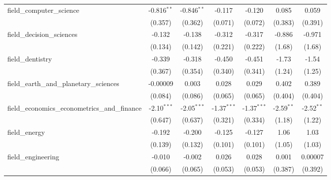 \begin{tabular}{lcccccc}
   field\_computer\_science                                    & -0.816$^{**}$ & -0.846$^{**}$  & -0.117        & -0.120         & 0.085         & 0.059\\   
                                                               & (0.357)       & (0.362)        & (0.071)       & (0.072)        & (0.383)       & (0.391)\\   
   field\_decision\_sciences                                   & -0.132        & -0.138         & -0.312        & -0.317         & -0.886        & -0.971\\   
                                                               & (0.134)       & (0.142)        & (0.221)       & (0.222)        & (1.68)        & (1.68)\\   
   field\_dentistry                                            & -0.339        & -0.318         & -0.450        & -0.451         & -1.73         & -1.54\\   
                                                               & (0.367)       & (0.354)        & (0.340)       & (0.341)        & (1.24)        & (1.25)\\   
   field\_earth\_and\_planetary\_sciences                      & -0.00009      & 0.003          & 0.028         & 0.029          & 0.402         & 0.389\\   
                                                               & (0.084)       & (0.086)        & (0.065)       & (0.065)        & (0.404)       & (0.404)\\   
   field\_economics\_econometrics\_and\_finance                & -2.10$^{***}$ & -2.05$^{***}$  & -1.37$^{***}$ & -1.37$^{***}$  & -2.59$^{**}$  & -2.52$^{**}$\\   
                                                               & (0.647)       & (0.637)        & (0.321)       & (0.334)        & (1.18)        & (1.22)\\   
   field\_energy                                               & -0.192        & -0.200         & -0.125        & -0.127         & 1.06          & 1.03\\   
                                                               & (0.139)       & (0.132)        & (0.101)       & (0.101)        & (1.05)        & (1.03)\\   
   field\_engineering                                          & -0.010        & -0.002         & 0.026         & 0.028          & 0.001         & 0.00007\\   
                                                               & (0.066)       & (0.065)        & (0.053)       & (0.053)        & (0.387)       & (0.392)\\   

\end{tabular}

